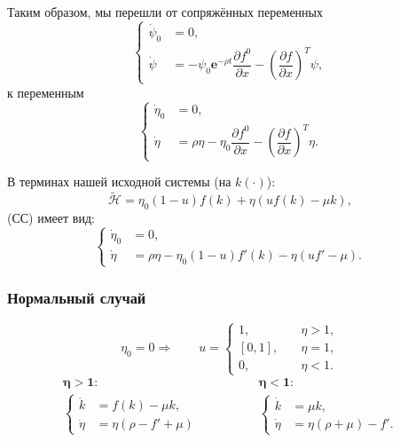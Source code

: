 \documentclass[12pt, a4paper]{article}
\theoremstyle{rusdef}
\newcommand{\e}{\mathbf{e}}
\renewcommand{\H}{\mathcal{H}} %
\renewcommand{\d}{\partial} %
\DeclareMathOperator*{\thus}{\Rightarrow} %
\begin{document}
Таким образом, мы перешли от сопряжённых переменных
\[
  \left\{
    \begin{aligned}
      \dot{\psi}_0 &= 0, \\
      \dot{\psi} &= -\psi_0\e^{-\rho t} \dfrac{\d f^0}{\d x} - \left(\dfrac{\d f}{\d x}\right)^T \psi,
    \end{aligned}
  \right.
\]
к переменным
\[
  \left\{
    \begin{aligned}
      \dot{\eta}_0 &= 0, \\
      \dot{\eta} &= \rho \eta - \eta_0 \dfrac{\d f^0}{\d x} - \left(\dfrac{\d f}{\d x}\right)^T \eta.
    \end{aligned}
  \right.
\]

В терминах нашей исходной системы (на $k(\cdot)$):
\[
  \tilde{\H} = \eta_0 (1 - u)f(k) + \eta(uf(k) - \mu k),
\]
(СС) имеет вид:
\[
  \left\{
    \begin{aligned}
      \dot{\eta}_0 &= 0, \\
      \dot{\eta} &= \rho \eta - \eta_0 (1 - u)f'(k) - \eta (u f' - \mu).
    \end{aligned}
  \right.
\]

\subsubsection*{Нормальный случай}
\[
  \eta_0 = 0 \thus \qquad
  u =
  \left\{
    \begin{aligned}
      1, &\quad \eta > 1, \\
      [0,1], &\quad \eta = 1, \\
      0, &\quad \eta  < 1.
    \end{aligned}
  \right.
\]
\[
  \begin{gathered}
    \bm{\eta > 1 \colon}\\
    \left\{
      \begin{aligned}
        \dot{k} &= f(k) - \mu k, \\
        \dot{\eta} &= \eta(\rho - f' + \mu)
      \end{aligned}
    \right.
  \end{gathered}
  \qquad \qquad
  \begin{gathered}
    \bm{\eta < 1 \colon}\\
    \left\{
      \begin{aligned}
        \dot{k} &= \mu k, \\
        \dot{\eta} &= \eta(\rho + \mu) - f'.
      \end{aligned}
    \right.
  \end{gathered}
\]
\end{document}

